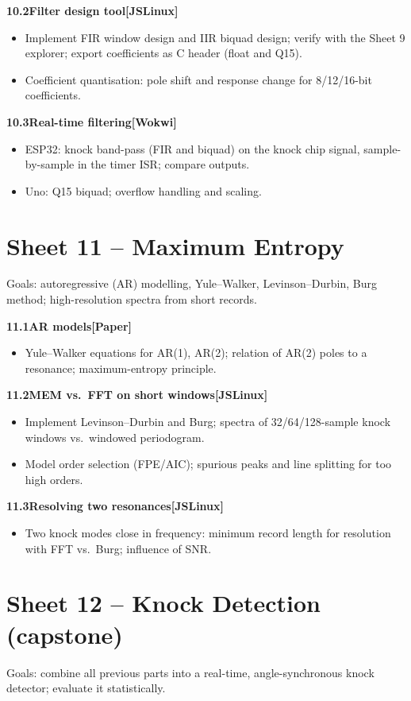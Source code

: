 \documentclass[11pt,a4paper]{article}
\newcommand{\W}{\textsf{\textbf{[Wokwi]}}}
\newcommand{\J}{\textsf{\textbf{[JSLinux]}}}
\newcommand{\Pap}{\textsf{\textbf{[Paper]}}}
\newcommand{\exercise}[4]{%
  \par\smallskip\noindent\textbf{#1\quad #2}\hfill#3\par
  \nopagebreak\begin{itemize}[leftmargin=1.2em]#4\end{itemize}}
\begin{document}
\exercise{10.2}{Filter design tool}{\J}{
  \item Implement FIR window design and IIR biquad design; verify with the
    Sheet 9 explorer; export coefficients as C header (float and Q15).
  \item Coefficient quantisation: pole shift and response change for
    8/12/16-bit coefficients.}

\exercise{10.3}{Real-time filtering}{\W}{
  \item ESP32: knock band-pass (FIR and biquad) on the knock chip signal,
    sample-by-sample in the timer ISR; compare outputs.
  \item Uno: Q15 biquad; overflow handling and scaling.}

\section{Sheet 11 -- Maximum Entropy}
\begin{sheetinfo}
Goals: autoregressive (AR) modelling, Yule--Walker, Levinson--Durbin,
Burg method; high-resolution spectra from short records.
\end{sheetinfo}

\exercise{11.1}{AR models}{\Pap}{
  \item Yule--Walker equations for AR(1), AR(2); relation of AR(2) poles to
    a resonance; maximum-entropy principle.}

\exercise{11.2}{MEM vs.\ FFT on short windows}{\J}{
  \item Implement Levinson--Durbin and Burg; spectra of 32/64/128-sample
    knock windows vs.\ windowed periodogram.
  \item Model order selection (FPE/AIC); spurious peaks and line splitting
    for too high orders.}

\exercise{11.3}{Resolving two resonances}{\J}{
  \item Two knock modes close in frequency: minimum record length for
    resolution with FFT vs.\ Burg; influence of SNR.}

\section{Sheet 12 -- Knock Detection (capstone)}
\begin{sheetinfo}
Goals: combine all previous parts into a real-time, angle-synchronous
knock detector; evaluate it statistically.
\end{sheetinfo}
\end{document}
